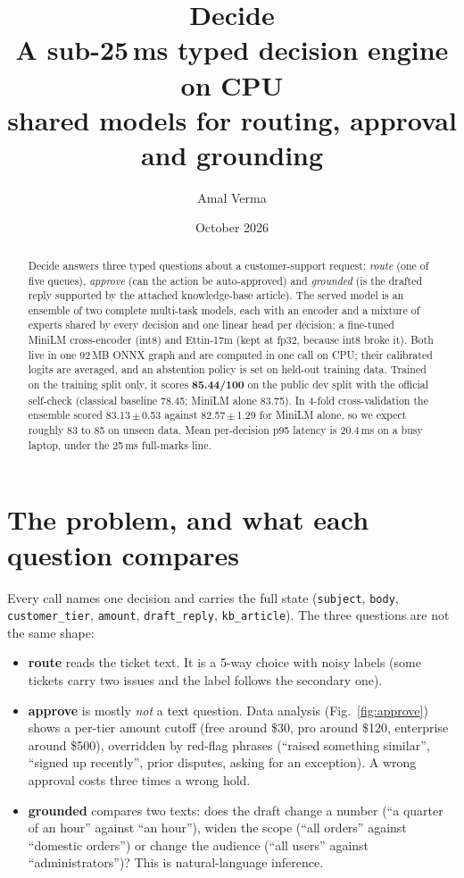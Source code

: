 \documentclass[11pt,a4paper]{article}
\title{\textbf{Decide}\\[2pt]\large A sub-25\,ms typed decision engine on CPU\\shared models for routing, approval and grounding}
\author{Amal Verma}
\date{October 2026}
\begin{document}
\maketitle

\begin{abstract}
\noindent
Decide answers three typed questions about a customer-support request:
\emph{route} (one of five queues), \emph{approve} (can the action be
auto-approved) and \emph{grounded} (is the drafted reply supported by the
attached knowledge-base article). The served model is an ensemble of two
complete multi-task models, each with an encoder and a mixture of experts shared
by every decision and one linear head per decision: a fine-tuned MiniLM
cross-encoder (int8) and Ettin-17m (kept at fp32, because int8 broke it). Both
live in one 92\,MB ONNX graph and are computed in one call on CPU; their
calibrated logits are averaged, and an abstention policy is set on held-out
training data. Trained on the training split only, it scores
\textbf{85.44/100} on the public dev split with the official self-check
(classical baseline 78.45; MiniLM alone 83.75). In 4-fold cross-validation the
ensemble scored 83.13\,$\pm$\,0.53 against 82.57\,$\pm$\,1.29 for MiniLM alone,
so we expect roughly 83 to 85 on unseen data. Mean per-decision p95 latency is
20.4\,ms on a busy laptop, under the 25\,ms full-marks line.
\end{abstract}

\section{The problem, and what each question compares}

Every call names one decision and carries the full state
(\texttt{subject}, \texttt{body}, \texttt{customer\_tier}, \texttt{amount},
\texttt{draft\_reply}, \texttt{kb\_article}). The three questions are not the
same shape:

\begin{itemize}
  \item \textbf{route} reads the ticket text. It is a 5-way choice with noisy labels
        (some tickets carry two issues and the label follows the secondary one).
  \item \textbf{approve} is mostly \emph{not} a text question. Data analysis
        (Fig.~\ref{fig:approve}) shows a per-tier amount cutoff (free around \$30,
        pro around \$120, enterprise around \$500), overridden by red-flag phrases
        (``raised something similar'', ``signed up recently'', prior disputes,
        asking for an exception). A wrong approval costs three times a wrong hold.
  \item \textbf{grounded} compares two texts: does the draft change a number
        (``a quarter of an hour'' against ``an hour''), widen the scope (``all orders''
        against ``domestic orders'') or change the audience (``all users'' against
        ``administrators'')? This is natural-language inference.
\end{itemize}
\end{document}
